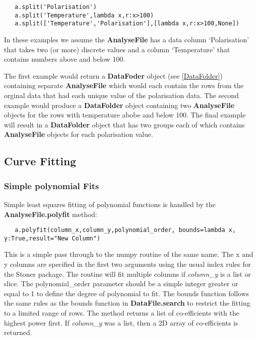\documentclass[a4paper,11pt]{scrartcl}
\begin{document}
\begin{lstlisting}
   a.split('Polarisation')
   a.split('Temperature',lambda x,r:x>100)
   a.split(['Temperature','Polarisation'],[lambda x,r:x>100,None])
\end{lstlisting}

In these examples we assume the \textbf{AnalyseFile} has a data column `Polarisation' that takes two (or more) discrete values
and a column `Temperature' that contains numbers above and below 100.

The first example would return a \textbf{DataFoder} object (see \ref{DataFolder}) containing separate \textbf{AnalyseFile} which
would each contain the rows from the orginal data that had each unique value of the polarisation data. The second example would
produce a \textbf{DataFolder} object containing two \textbf{AnalyseFile} objects for the rows with temperature abobe and below 100.
The final example will result in a \textbf{DataFolder} object that has two groups each of which contains \textbf{AnalyseFile} objects for each
polarisation value.

\subsection{Curve Fitting}

\subsubsection{Simple polynomial Fits}

Simple least squares fitting of polynomial functions is handled by the
\textbf{AnalyseFile.polyfit} method:

\begin{lstlisting}
   a.polyfit(column_x,column_y,polynomial_order, bounds=lambda x, y:True,result="New Column")
\end{lstlisting}

This is a simple pass through to the numpy routine of the same name. The x and y
columns are specified in the first two arguments using the usual index rules for
the Stoner package. The routine will fit multiple columns if \textit{column\_y}
is a list or slice. The polynomial\_order parameter should be a simple integer
greater or equal to 1 to define the degree of polynomial to fit. The bounds
function follows the same rules as the bounds function in
\textbf{DataFile.search} to restrict the fitting to a limited range of rows. The
method returns a list of co-efficients with the highest power first. If
\textit{column\_y} was a list, then a 2D array of co-efficients is returned.
\end{document}
